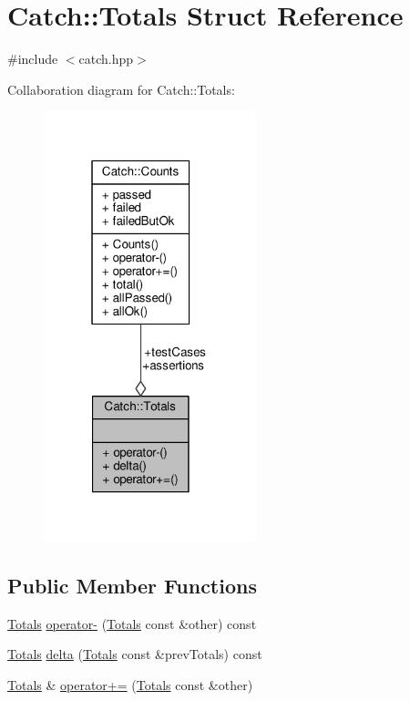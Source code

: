 \hypertarget{struct_catch_1_1_totals}{\section{Catch\-:\-:Totals Struct Reference}
\label{struct_catch_1_1_totals}
}


{\ttfamily \#include $<$catch.\-hpp$>$}



Collaboration diagram for Catch\-:\-:Totals\-:
\nopagebreak
\begin{figure}[H]
\begin{center}
\leavevmode
\includegraphics[width=175pt]{struct_catch_1_1_totals__coll__graph}
\end{center}
\end{figure}
\subsection*{Public Member Functions}
\begin{DoxyCompactItemize}
\item 
\hyperlink{struct_catch_1_1_totals}{Totals} \hyperlink{struct_catch_1_1_totals_abe15cd8a82ba9a4868dd7a542add827c}{operator-\/} (\hyperlink{struct_catch_1_1_totals}{Totals} const \&other) const 
\item 
\hyperlink{struct_catch_1_1_totals}{Totals} \hyperlink{struct_catch_1_1_totals_a3dee0f599c081a8360c0112fb1dafe8f}{delta} (\hyperlink{struct_catch_1_1_totals}{Totals} const \&prev\-Totals) const 
\item 
\hyperlink{struct_catch_1_1_totals}{Totals} \& \hyperlink{struct_catch_1_1_totals_a574015076e54cc405c70b053e3356e43}{operator+=} (\hyperlink{struct_catch_1_1_totals}{Totals} const \&other)
\end{DoxyCompactItemize}
